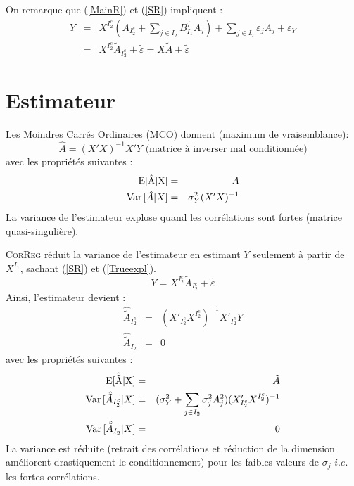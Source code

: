 \documentclass[12pt]{article}
\begin{document}
On remarque que (\ref{MainR}) et (\ref{SR}) impliquent :
\begin{eqnarray}
	Y&=&X^{I_2^c} (A_{I_2^c}+ \sum_{j \in I_2}B^{j}_{I_1}A_{j})+  \sum_{j \in I_2}\varepsilon_{j}A_{j}+\varepsilon_Y \\
					&=& X^{I_2^c}\tilde{A}_{I_2^c}+ \tilde{\varepsilon}=X\tilde{A}+ \tilde{\varepsilon}\label{Trueexpl} 			
\end{eqnarray}
\section{Estimateur}
	Les Moindres Carrés Ordinaires (MCO) donnent (maximum de vraisemblance): 
		\begin{equation}
			\hat A = (X'X)^{-1}X'Y \textrm{ (matrice à inverser mal conditionnée)}
		\end{equation}
		avec les propriétés suivantes :
		\begin{eqnarray}
			\rm{E}[\hat{A}|X]&=&A \\
			{\rm Var}\,[\hat{A}|X]&=& \sigma_Y^2(X'X)^{-1}
		\end{eqnarray}				
		La variance de l'estimateur explose quand les corrélations sont fortes (matrice quasi-singulière).
 			
		\textsc{CorReg} réduit la variance de l'estimateur en estimant $Y$ seulement à partir de $X^{I_1}$, sachant (\ref{SR}) et (\ref{Trueexpl}).
			\begin{equation}
				Y= X^{I_2^c}\tilde{A}_{I_2^c}+ \tilde{\varepsilon}\label{explicatif}
			\end{equation}							
		Ainsi, l'estimateur devient : 
		\begin{eqnarray}
			\hat{\tilde{A}}_{I_2^c} &=& (X'_{I_2^c} X^{I_2^c})^{-1}X'_{I_2^c}Y \\
			\hat{\tilde{A}}_{I_2} &=& 0
		\end{eqnarray}
		avec les propriétés suivantes :
		\begin{eqnarray}
			\rm{E}[\hat{\tilde{A}}|X]&=&\tilde{A} \\
			{\rm Var}\,[\hat{\tilde{A}}_{I_2^c}|X]&=& (\sigma^2_Y+\sum_{j \in I_2}\sigma^2_{j}A_{j}^2 )(X'_{I_2^c} X^{I_2^c})^{-1} \\
			{\rm Var}\,[\hat{\tilde{A}}_{I_2}|X]&=& 0 
		\end{eqnarray}
		La variance est réduite (retrait des corrélations et réduction de la dimension améliorent drastiquement le conditionnement) pour les faibles valeurs de $\sigma_j$ $i.e.$ les fortes corrélations.					
		
\end{document}

